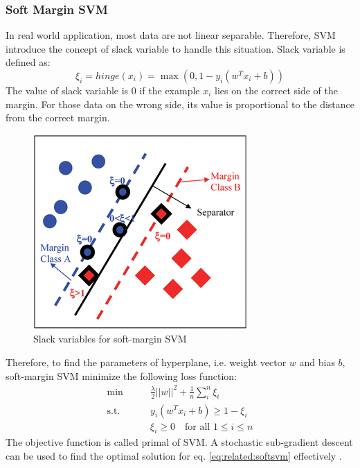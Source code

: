 \subsubsection{Soft Margin SVM}
In real world application, most data are not linear separable. Therefore, SVM introduce the concept of slack variable to handle this situation. Slack variable is defined as:
\begin{equation}
\xi_i  = hinge(x_i) = \max (0,1-y_i(w^Tx_i+b))
\end{equation}
The value of slack variable is 0 if the example $x_i$ lies on the correct side of the margin. For those data on the wrong side, its value is proportional to the distance from the correct margin.
\begin{figure}
	\centering
	\includegraphics[scale =1.2]{relatedwork/fig/slack.png}
	\caption{Slack variables for soft-margin SVM}
\end{figure}

Therefore, to find the parameters of hyperplane, i.e. weight vector $w$ and bias $b$, soft-margin SVM minimize the following loss function:
\begin{equation}\label{eq:related:softsvm}
\begin{aligned}
\min \qquad &  \frac{\lambda}{2}||w||^2+\frac{1}{n}\sum_{i}^{n}\xi_i\\
\text{s.t.}\qquad & y_i(w^Tx_i+b) \geq 1-\xi_i \\
& \xi_i \geq 0     \quad \text{for all } 1\leq i \leq n
\end{aligned}
\end{equation}
The objective function is called primal of SVM. A stochastic sub-gradient descent can be used to find the optimal solution for eq. \eqref{eq:related:softsvm} effectively \cite{shalev2011pegasos}. 
